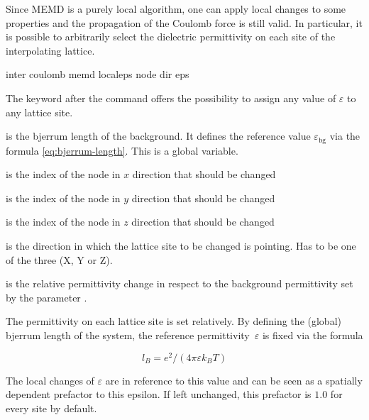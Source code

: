 Since MEMD is a purely local algorithm, one can apply local changes
to some properties and the propagation of the Coulomb force is still
valid. In particular, it is possible to arbitrarily select the
dielectric permittivity on each site of the interpolating lattice.

\begin{essyntax}
  inter coulomb 
  memd localeps node   
  dir  eps \var{\varepsilon}
  \begin{features}
  \end{features}
\end{essyntax}

The keyword  after the 
command offers the possibility to assign any value of $\varepsilon$
to any lattice site.

\begin{arguments}
\item[\var{l_B}] is the bjerrum length of the background. It defines
	the reference value $\varepsilon_\text{bg}$ via the formula 
	\eqref{eq:bjerrum-length}. This is a global variable.
\item[\var{node\_x}] is the index of the node in $x$ direction that
	should be changed
\item[\var{node\_y}] is the index of the node in $y$ direction that
	should be changed
\item[\var{node\_z}] is the index of the node in $z$ direction that
	should be changed
\item[\var{X/Y/Z}] is the direction in which the lattice site to be
	changed is pointing. Has to be one of the three (X, Y or Z).
\item[\var{\varepsilon}] is the relative permittivity change in
	respect to the background permittivity set by the parameter
	.
\end{arguments}

The permittivity on each lattice site is set relatively. By defining
the (global) bjerrum length of the system, the reference
permittivity~$\varepsilon$ is fixed via the formula

\begin{equation}
l_B = e^2 / (4 \pi \varepsilon k_B T)
\label{eq:bjerrum-length}
\end{equation}

The local changes of $\varepsilon$ are in reference to this value
and can be seen as a spatially dependent prefactor to this epsilon.
If left unchanged, this prefactor is $1.0$ for every site by
default.

